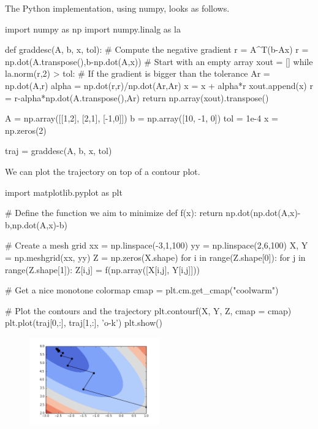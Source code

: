 \documentclass{article}
\begin{document}
The Python implementation, using numpy, looks as follows.

\begin{ipythonnb}
import numpy as np
import numpy.linalg as la

def graddesc(A, b, x, tol):
    # Compute the negative gradient r = A^T(b-Ax)
    r = np.dot(A.transpose(),b-np.dot(A,x))
    # Start with an empty array
    xout = []
    while la.norm(r,2) > tol:
        # If the gradient is bigger than the tolerance
        Ar = np.dot(A,r)
        alpha = np.dot(r,r)/np.dot(Ar,Ar)
        x = x + alpha*r
        xout.append(x)
        r = r-alpha*np.dot(A.transpose(),Ar)
    return np.array(xout).transpose()
    
A = np.array([[1,2], [2,1], [-1,0]])
b = np.array([10, -1, 0])
tol = 1e-4
x = np.zeros(2)

traj = graddesc(A, b, x, tol)
\end{ipythonnb}

We can plot the trajectory on top of a contour plot.
 
\begin{ipythonnb}
import matplotlib.pyplot as plt

# Define the function we aim to minimize
def f(x):
    return np.dot(np.dot(A,x)-b,np.dot(A,x)-b)

# Create a mesh grid 
xx = np.linspace(-3,1,100)
yy = np.linspace(2,6,100)
X, Y = np.meshgrid(xx, yy)
Z = np.zeros(X.shape)
for i in range(Z.shape[0]):
    for j in range(Z.shape[1]):
        Z[i,j] = f(np.array([X[i,j], Y[i,j]]))

# Get a nice monotone colormap
cmap = plt.cm.get_cmap("coolwarm")

# Plot the contours and the trajectory
plt.contourf(X, Y, Z, cmap = cmap)
plt.plot(traj[0,:], traj[1,:], 'o-k')
plt.show()
\end{ipythonnb}

\begin{figure}[h!]
\centering
\includegraphics[width=0.5\textwidth]{images/contourtraj.png}
\end{figure}
\end{document}
